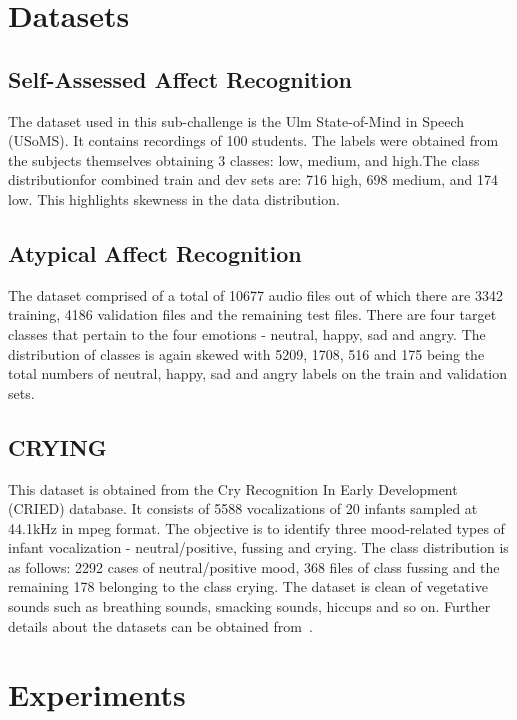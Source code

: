 \section{Datasets}

\subsection{Self-Assessed Affect Recognition}
The dataset used in this sub-challenge is the Ulm State-of-Mind in Speech (USoMS). It contains recordings of 100 students. The labels were obtained from the subjects themselves obtaining 3 classes: low, medium, and high.The class distributionfor combined train and dev sets are: 716 high, 698 medium, and 174 low. This highlights skewness in the data distribution.

\subsection{Atypical Affect Recognition}
The dataset comprised of a total of 10677 audio files out of which there are 3342 training, 4186 validation files and the remaining test files. There are four target classes that pertain to the four emotions - neutral, happy, sad and angry. The distribution of classes is again skewed with 5209, 1708, 516 and 175 being the total numbers of neutral, happy, sad and angry labels on the train and validation sets.

\subsection{CRYING}

This dataset is obtained from the Cry Recognition In Early Development (CRIED) database. It consists of 5588 vocalizations of 20 infants sampled at 44.1kHz in mpeg format. The objective is to identify three mood-related types of infant vocalization - neutral/positive, fussing and crying. The class distribution is as follows: 2292 cases of neutral/positive mood, 368 files of class fussing and the remaining 178 belonging to the class crying. The dataset is clean of vegetative sounds such as breathing sounds, smacking sounds, hiccups and so on. Further details about the datasets can be obtained from~\cite{schuller2018compare}. 




\section{Experiments}

